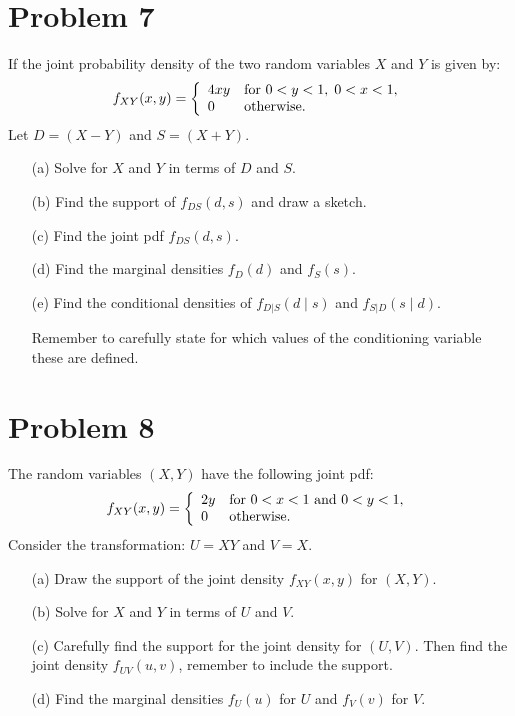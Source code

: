 \documentclass{article}
\newcommand{\1}{\mathbf{1}}
\begin{document}
\eject




\newpage
\section*{Problem 7} 
If the joint probability density of the two random variables $X$ and $Y$ is given by:
\[
f_{XY}(x,y) =\left\{\begin{array}{ll}
4xy & \hbox{for } 0 < y<1,\; 0<x <1,\\
0 & \hbox{otherwise.}
\end{array}
\right.
\]
Let $D=(X-Y)$ and $S=(X+Y)$.  
\begin{itemize}
\item[(a)] Solve for $X$  and $Y$ in terms of $D$ and $S$.

\item [(b)] Find the support of $f_{DS}(d,s)$ and draw a sketch.

\item[(c)] Find the joint pdf $f_{DS}(d,s)$.

\item[(d)] Find the marginal densities $f_D(d)$ and $f_S(s)$.

\item[(e)] Find the conditional densities of $f_{D|S}(d\mid s)$ and $f_{S|D}(s\mid d)$.\par

 Remember to carefully state for which values of the conditioning variable these are defined.
\end{itemize}



\newpage
\section*{Problem 8} The random variables $(X,Y)$ have the following joint pdf:
\[
f_{XY}(x,y) =\left\{\begin{array}{ll}
2y & \hbox{for } 0 < x < 1 \hbox{ and } 0 < y <1,\\ 
0 & \hbox{otherwise.}
\end{array}
\right.
\]
Consider the transformation: $U = XY$ and $ V=X$.

\begin{itemize}
\item[(a)] Draw the support of the joint density $f_{XY}(x,y)$ for $(X,Y)$.

\item[(b)] Solve for $X$ and $Y$ in terms of $U$ and $V$.

\item[(c)] Carefully find the support for the joint density for $(U,V)$.
 Then find the joint density $f_{UV}(u,v)$, remember to include the support.
\item[(d)] Find the marginal densities $f_U(u)$ for $U$ and  $f_V(v)$ for $V$.


\end{itemize}
\end{document}
